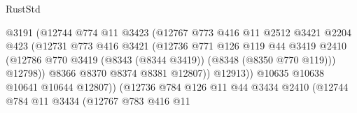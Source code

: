 \begin{lexlean}{RustStd}
\begin{coremodule}
{\begin{coremodule}
{{{{{{{{{{{{{{{{{{{{{{{{{{{{{{{{{{{{{{{{{{{{{{{{{{                                      @3191
                                      (@12744
                                        @774
                                        @11
                                        @3423
                                        (@12767
                                          @773
                                          @416
                                          @11
                                          @2512
                                          @3421
                                          @2204
                                          @423
                                          (@12731
                                            @773
                                            @416
                                            @3421
                                            (@12736
                                              @771
                                              @126
                                              @119
                                              @44
                                              @3419
                                              @2410
                                              (@12786
                                                @770
                                                @3419
                                                (@8343 (@8344 @3419))
                                                (@8348 (@8350 @770 @119)))
                                              @12798))
                                          @8366
                                          @8370
                                          @8374
                                          @8381
                                          @12807))
                                      @12913))
                                  @10635
                                  @10638
                                  @10641
                                  @10644
                                  @12807))
                              (@12736
                                @784
                                @126
                                @11
                                @44
                                @3434
                                @2410
                                (@12744
                                  @784
                                  @11
                                  @3434
                                  (@12767
                                    @783
                                    @416
                                    @11
}}}}}}}}}}}}}}}}}}}}}}}}}}}}}}}}}}}}}}}}}}}}}}}}}}
\end{coremodule}}
\end{coremodule}
\end{lexlean}
